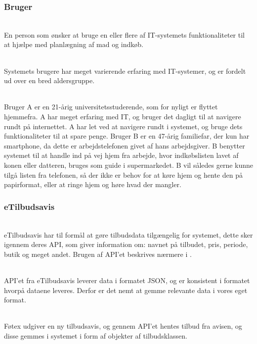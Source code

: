 \subsubsection{Bruger}
\vspace{-6pt}
\begin{description}[font=\normalfont\itshape]
\item[Formål]\hfill\\
En person som ønsker at bruge en eller flere af IT-systemets funktionaliteter til at hjælpe med planlægning af mad og indkøb.
\item[Karakteristik]\hfill\\
Systemets brugere har meget varierende erfaring med IT-systemer, og er fordelt ud over en bred aldersgruppe.
\item[Eksempler]\hfill\\
Bruger A er en 21-årig universitetsstuderende, som for nyligt er flyttet hjemmefra. A har meget erfaring med IT, og bruger det dagligt til at navigere rundt på internettet.
A har let ved at navigere rundt i systemet, og bruge dets funktionaliteter til at spare penge.
Bruger B er en 47-årig familiefar, der kun har smartphone, da dette er arbejdstelefonen givet af hans arbejdsgiver.
B benytter systemet til at handle ind på vej hjem fra arbejde, hvor indkøbslisten lavet af konen eller datteren, bruges som guide i supermarkedet.
B vil således gerne kunne tilgå listen fra telefonen, så der ikke er behov for at køre hjem og hente den på papirformat, eller at ringe hjem og høre hvad der mangler.
\end{description}

\subsubsection{eTilbudsavis}
\vspace{-6pt}
\begin{description}[font=\normalfont\itshape]
\item[Formål]\hfill\\ 
eTilbudsavis har til formål at gøre tilbudsdata tilgængelig for systemet, dette sker igennem deres API, som giver information om: navnet på tilbudet, pris, periode, butik og meget andet. 
Brugen af API'et beskrives nærmere i .
\item[Karakteristik]\hfill\\
API'et fra eTilbudsavis leverer data i formatet JSON, og er konsistent i formatet hvorpå dataene leveres. 
Derfor er det nemt at gemme relevante data i vores eget format.
\item[Eksempel]\hfill\\
Føtex udgiver en ny tilbudsavis, og gennem API'et hentes tilbud fra avisen, og disse gemmes i systemet i form af objekter af tilbudsklassen.
\end{description}

